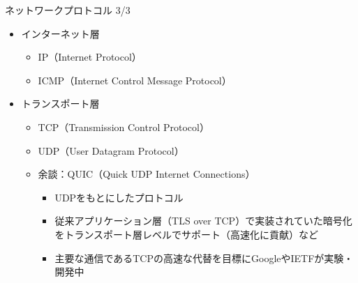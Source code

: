 \documentclass[12pt,aspectratio=169]{beamer}
\begin{document}
\begin{frame}{ネットワークプロトコル 3/3}

  \begin{itemize}
    \item インターネット層
      \begin{itemize}
        \item IP（Internet Protocol）
        \item ICMP（Internet Control Message Protocol）
      \end{itemize}

    \item トランスポート層
      \begin{itemize}
        \item TCP（Transmission Control Protocol）
        \item UDP（User Datagram Protocol）
        \item 余談：QUIC（Quick UDP Internet Connections）
          \begin{itemize}
            \item UDPをもとにしたプロトコル
            \item 従来アプリケーション層（TLS over TCP）で実装されていた暗号化をトランスポート層レベルでサポート（高速化に貢献）など
            \item 主要な通信であるTCPの高速な代替を目標にGoogleやIETFが実験・開発中
          \end{itemize}
      \end{itemize}

  \end{itemize}

\end{frame}
\end{document}
